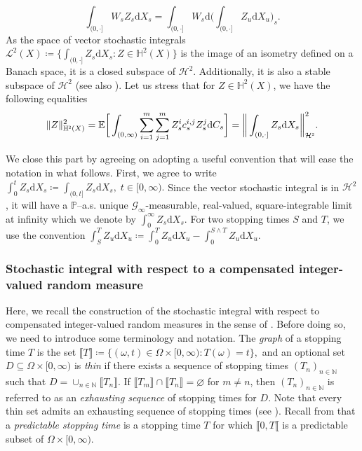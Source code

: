 \documentclass[10pt]{article} %
\newcommand\cG{\mathcal G}
\newcommand\cH{\mathcal H}
\newcommand\cL{\mathcal L}
\newcommand{\smalltext}[1]{\text{\fontsize{4}{4}\selectfont$#1$}}
\def \E{\mathbb{E}}
\def \H{\mathbb{H}}
\def \N{\mathbb{N}}
\def \P{\mathbb{P}}
\newcommand{\1}{\mathbf{1}}
\def\d{\mathrm{d}}
\begin{document}
		\begin{equation*}
			\int_{(0,\cdot]} W_sZ_s \d X_s = \int_{(0,\cdot]} W_s \d \bigg( \int_{(0,\cdot]} Z_u \d X_u \bigg)_s.
		\end{equation*}
As the space of vector stochastic integrals $\cL^2(X) \coloneqq \big\{ \int_{(0,\cdot]} Z_s \d X_s : Z \in \H^2(X) \big\}$ is the image of an isometry defined on a Banach space, it is a closed subspace of $\cH^2$. Additionally, it is also a stable subspace of $\cH^2$ (see also \cite[Definition 4.4 and Theorem 4.35]{jacod1979calcul}). Let us stress that for $Z \in \H^2(X)$, we have the following equalities
\begin{equation*}
	\|Z\|^2_{\H^\smalltext{2}(X)} = \E \bigg[ \int_{(0,\infty)}  \sum_{i=1}^m\sum_{j=1}^m Z^i_s c^{i,j}_s Z^j_s  \d C_s \bigg] = \bigg\| \int_{(0,\cdot]} Z_s \d X_s \bigg\|^2_{\cH^\smalltext{2}}.
\end{equation*}

We close this part by agreeing on adopting a useful convention that will ease the notation in what follows. First, we agree to write $\int_0^t Z_s \d X_s \coloneqq \int_{(0,t]} Z_s \d X_s, \; t \in [0,\infty).$ Since the vector stochastic integral is in $\cH^2$, it will have a $\P$--a.s. unique $\cG_\infty$-measurable, real-valued, square-integrable limit at infinity which we denote by $
 	\int_0^\infty Z_s \d X_s.$ For two stopping times $S$ and $T$, we use the convention $\int_S^T Z_u \d X_u \coloneqq \int_0^T Z_u \d X_u - \int_0^{S\land T} Z_u \d X_u.$

\subsubsection{Stochastic integral with respect to a compensated integer-valued random measure}\label{sec::compensated_si}

Here, we recall the construction of the stochastic integral with respect to compensated integer-valued random measures in the sense of \cite{cohen2015stochastic,jacod1979calcul,jacod2003limit}. Before doing so, we need to introduce some terminology and notation. The \emph{graph} of a stopping time $T$ is the set $\llbracket T \rrbracket \coloneqq \{(\omega,t) \in \Omega \times [0,\infty): T(\omega)= t\},$ and an optional set $D \subseteq \Omega \times [0,\infty)$ is \emph{thin} if there exists a sequence of stopping times $(T_n)_{n \in \N}$ such that $D = \cup_{n \in \N} \llbracket T_n \rrbracket.$ If $\llbracket T_m \rrbracket \cap \llbracket T_n \rrbracket = \varnothing$ for $m \neq n$, then $(T_n)_{n \in \N}$ is referred to as an \emph{exhausting sequence} of stopping times for $D$. Note that every thin set admits an exhausting sequence of stopping times (see \cite[Lemma I.1.31]{jacod2003limit}). Recall from  that a \emph{predictable stopping time} is a stopping time $T$ for which $\llbracket 0,T\llbracket$ is a predictable subset of $\Omega \times [0,\infty)$.
\end{document}
